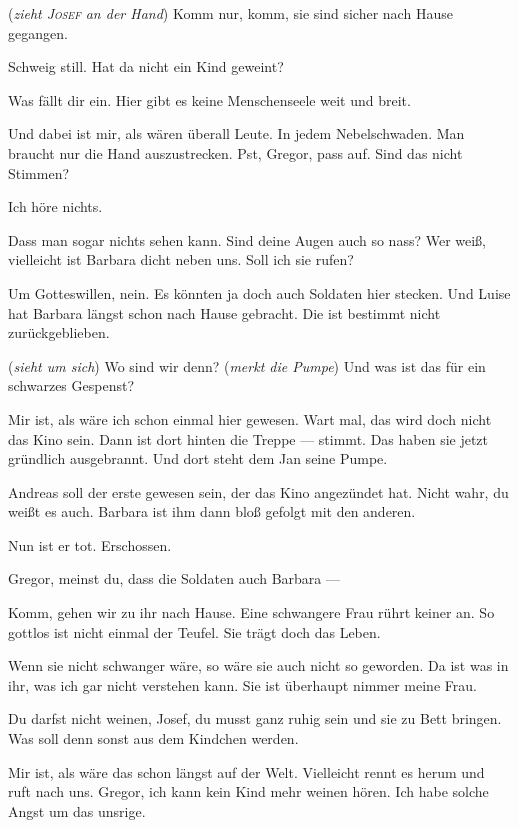 \documentclass[
	final,
	a4paper,
	ngerman,
	mpinclude = true, %
	twoside = true,
	open = right,
	cleardoublepage = plain,
	DIV = 13,
	BCOR = 1cm,
	titlepage = firstiscover,
	]{scrbook}
\newcommand{\direction}[1]{(\textit{#1})}
\newcommand{\thecharacter}[1]{\textup{\textsc{#1}}\xspace}
\newcommand{\theJosef}{\thecharacter{Josef}}
\newcommand{\theGregor}{\thecharacter{Gregor}}
\newcommand{\character}[1]{\item[#1]}
\newcommand{\Josef}{\character{\theJosef}}
\newcommand{\Gregor}{\character{\theGregor}}
\begin{document}
\begin{play}

\Gregor
\direction{zieht \theJosef an der Hand} Komm nur, komm, sie sind sicher nach Hause gegangen.

\Josef
Schweig still. Hat da nicht ein Kind geweint?

\Gregor
Was fällt dir ein. Hier gibt es keine Menschenseele weit und breit.

\Josef
Und dabei ist mir, als wären überall Leute. In jedem Nebelschwaden. Man braucht nur die Hand auszustrecken. Pst, Gregor, pass auf. Sind das nicht Stimmen?

\Gregor
Ich höre nichts.

\Josef
Dass man sogar nichts sehen kann. Sind deine Augen auch so nass? Wer weiß, vielleicht ist Barbara dicht neben uns. Soll ich sie rufen?

\Gregor
Um Gotteswillen, nein. Es könnten ja doch auch Soldaten hier stecken. Und Luise hat Barbara längst schon nach Hause gebracht. Die ist bestimmt nicht zurückgeblieben.

\Josef
\direction{sieht um sich} Wo sind wir denn? \direction{merkt die Pumpe} Und was ist das für ein schwarzes Gespenst?

\Gregor
Mir ist, als wäre ich schon einmal hier gewesen. Wart mal, das wird doch nicht das Kino sein. Dann ist dort hinten die Treppe --- stimmt. Das haben sie jetzt gründlich ausgebrannt. Und dort steht dem Jan seine Pumpe.

\Josef
Andreas soll der erste gewesen sein, der das Kino angezündet hat. Nicht wahr, du weißt es auch. Barbara ist ihm dann bloß gefolgt mit den anderen.

\Gregor
Nun ist er tot. Erschossen.

\Josef
Gregor, meinst du, dass die Soldaten auch Barbara ---

\Gregor
Komm, gehen wir zu ihr nach Hause. Eine schwangere Frau rührt keiner an. So gottlos ist nicht einmal der Teufel. Sie trägt doch das Leben.

\Josef
Wenn sie nicht schwanger wäre, so wäre sie auch nicht so geworden. Da ist was in ihr, was ich gar nicht verstehen kann. Sie ist überhaupt nimmer meine Frau.

\Gregor
Du darfst nicht weinen, Josef, du musst ganz ruhig sein und sie zu Bett bringen. Was soll denn sonst aus dem Kindchen werden.

\Josef
Mir ist, als wäre das schon längst auf der Welt. Vielleicht rennt es herum und ruft nach uns. Gregor, ich kann kein Kind mehr weinen hören. Ich habe solche Angst um das unsrige. 


\end{play}
\end{document}
